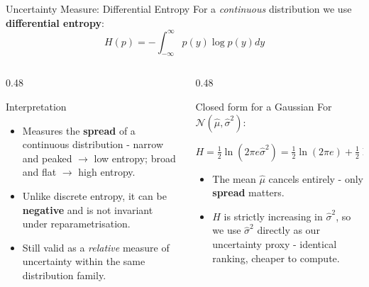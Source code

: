\documentclass[aspectratio=169]{beamer}
\begin{document}
	\begin{frame}{Uncertainty Measure: Differential Entropy}
		For a \textit{continuous} distribution we use \textbf{differential entropy}:
		$$H(p) = -\int_{-\infty}^{\infty} p(y) \log p(y) dy$$
		\vspace{0.1em}
		\begin{columns}
			\begin{column}{0.48\textwidth}
				\begin{block}{Interpretation}
					\small
					\begin{itemize}
						\item Measures the \textbf{spread} of a continuous distribution - narrow and peaked $\to$ low entropy; broad and flat $\to$ high entropy.
						\item Unlike discrete entropy, it can be \textbf{negative} and is not invariant under reparametrisation.
						\item Still valid as a \textit{relative} measure of uncertainty within the same distribution family.
					\end{itemize}
				\end{block}
			\end{column}
			\begin{column}{0.48\textwidth}
				\begin{block}{Closed form for a Gaussian}
					\small
					For $\mathcal{N}(\hat{\mu}, \hat{\sigma}^2)$:\\
					
					\vspace{0.75em}
					
					\hspace{0.55em} $H = \frac{1}{2} \ln(2\pi e \hat{\sigma}^2) = \frac{1}{2} \ln(2\pi e) + \frac{1}{2} \ln \hat{\sigma}^2$
					
					\vspace{0.2em}
					
					\begin{itemize}
						\item The mean $\hat{\mu}$ cancels entirely - only \textbf{spread} matters.
						\item $H$ is strictly increasing in $\hat{\sigma}^2$, so we use $\hat{\sigma}^2$ directly as our uncertainty proxy - identical ranking, cheaper to compute.
					\end{itemize}
				\end{block}
			\end{column}
		\end{columns}
	\end{frame}
	
\end{document}
